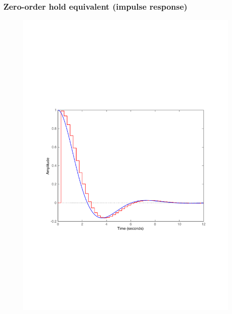 \begin{frame}
	\frametitle{Zero-order hold equivalent (impulse response)}
	\vspace{-0.7em}
	\begin{figure}
		\centering
		\includegraphics[width=0.8\linewidth]{vb1I}
	\end{figure}
\end{frame}

